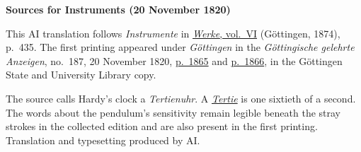 \clearpage\thispagestyle{empty}
\begin{center}\textbf{Sources for Instruments (20 November 1820)}\end{center}
\noindent This AI translation follows \textit{Instrumente} in \href{https://gdz.sub.uni-goettingen.de/id/PPN236007467}{\textit{Werke}, vol.~VI} (Göttingen, 1874), p.~435. The first printing appeared under \textit{Göttingen} in the \textit{Göttingische gelehrte Anzeigen}, no.~187, 20 November 1820, \href{https://images.p.sub.uni-goettingen.de/iiif/image/gdz:PPN319721507_1820:00001879/full/1600,/0/default.jpg}{p.~1865} and \href{https://images.p.sub.uni-goettingen.de/iiif/image/gdz:PPN319721507_1820:00001880/full/1600,/0/default.jpg}{p.~1866}, in the Göttingen State and University Library copy.
\par\smallskip\noindent The source calls Hardy’s clock a \textit{Tertienuhr}. A \href{https://www.duden.de/rechtschreibung/Tertie}{\textit{Tertie}} is one sixtieth of a second. The words about the pendulum’s sensitivity remain legible beneath the stray strokes in the collected edition and are also present in the first printing. Translation and typesetting produced by AI.
\clearpage
